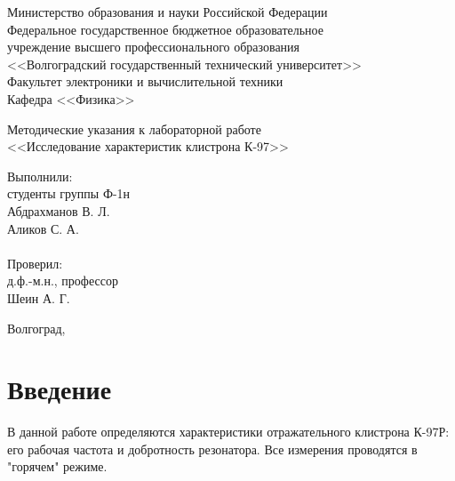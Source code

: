 \documentclass[a4paper,14pt]{extarticle}
\begin{document}
	\begin{titlepage}
        \begin{center}
          Министерство образования и науки Российской Федерации \\
          Федеральное государственное бюджетное образовательное \\
          учреждение высшего профессионального образования \\
          <<Волгоградский государственный технический университет>> \\
          Факультет электроники и вычислительной техники\\
          Кафедра <<Физика>>
        \end{center}
        \vspace{9em}
        \begin{center}
          \large
            Методические указания к лабораторной работе\\
            <<Исследование характеристик клистрона К-97>>
        \end{center}
        \vspace{5em}
        \begin{flushright}
          \begin{minipage}{.40\textwidth}
            Выполнили:\\
            студенты группы Ф-1н\\
            Абдрахманов В. Л.\\
            Аликов С. А.\\
            \vspace{1em}\\
            Проверил:\\
            д.ф.-м.н., профессор\\
            Шеин А. Г.
          \end{minipage}
        \end{flushright}
        \vspace{\fill}
        \begin{center}
          Волгоград, \the\year
        \end{center}
    \end{titlepage}
    \setcounter{page}{2}
    \onehalfspacing
	\section*{Введение}
	В данной работе определяются характеристики отражательного клистрона К-97Р: его рабочая частота и добротность резонатора. Все измерения проводятся в "горячем" режиме.
	
\end{document}
